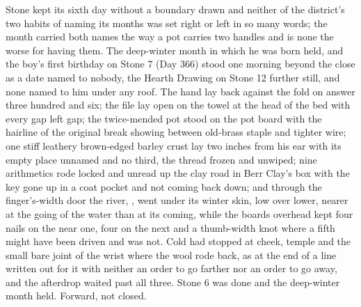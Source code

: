 Stone kept its sixth day without a boundary drawn and neither of the district's two habits of naming its months was set right or left in so many words; the month carried both names the way a pot carries two handles and is none the worse for having them. The deep-winter month in which he was born held, and the boy's first birthday on Stone 7 (Day 366) stood one morning beyond the close as a date named to nobody, the Hearth Drawing on Stone 12 further still, and none named to him under any roof. The hand lay back against the fold on answer three hundred and six; the file lay open on the towel at the head of the bed with every gap left gap; the twice-mended pot stood on the pot board with the hairline of the original break showing between old-brass staple and tighter wire; one stiff leathery brown-edged barley crust lay two inches from his ear with its empty place unnamed and no third, the thread frozen and unwiped; nine arithmetics rode locked and unread up the clay road in Berr Clay's box with the key gone up in a coat pocket and not coming back down; and through the finger's-width door the river, , went under its winter skin, low over lower, nearer at the going of the water than at its coming, while the boards overhead kept four nails on the near one, four on the next and a thumb-width knot where a fifth might have been driven and was not. Cold had stopped at cheek, temple and the small bare joint of the wrist where the wool rode back, as at the end of a line written out for it with neither an order to go farther nor an order to go away, and the afterdrop waited past all three. Stone 6 was done and the deep-winter month held. Forward, not closed.
